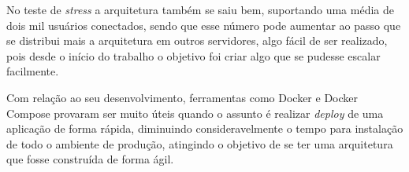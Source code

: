 No teste de \textit{stress} a arquitetura também se saiu bem, suportando uma média de dois mil usuários conectados, sendo que esse número pode aumentar ao passo que se distribui mais a arquitetura em outros servidores, algo fácil de ser realizado, pois desde o início do trabalho o objetivo foi criar algo que se pudesse escalar  facilmente.

Com relação ao seu desenvolvimento, ferramentas como Docker e Docker Compose provaram ser muito úteis quando o assunto é realizar \textit{deploy} de uma aplicação de forma rápida, diminuindo consideravelmente o tempo para instalação de todo o ambiente de produção, atingindo o objetivo de se ter uma arquitetura que fosse construída de forma ágil.
